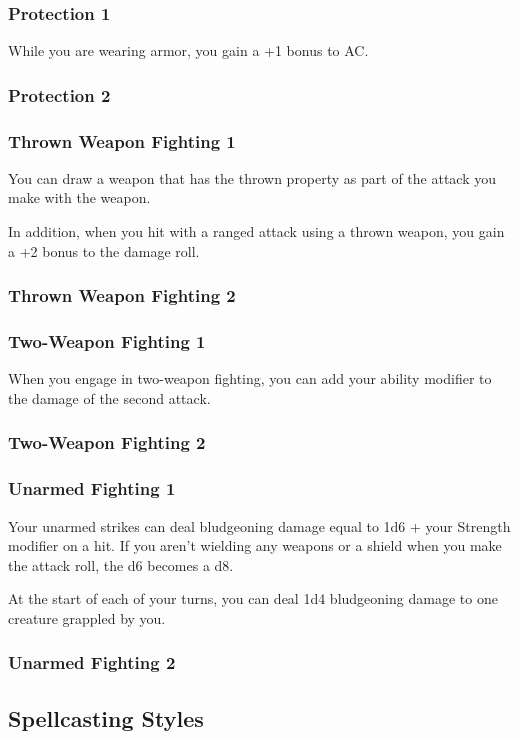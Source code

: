 \subsubsection{Protection 1}
    While you are wearing armor, you gain a +1 bonus to AC.
\subsubsection{Protection 2}
\subsubsection{Thrown Weapon Fighting 1}
    You can draw a weapon that has the thrown property as part of the attack you make with the weapon.

    In addition, when you hit with a ranged attack using a thrown weapon, you gain a +2 bonus to the damage roll.
\subsubsection{Thrown Weapon Fighting 2}
\subsubsection{Two-Weapon Fighting 1}
    When you engage in two-weapon fighting, you can add your ability modifier to the damage of the second attack.
\subsubsection{Two-Weapon Fighting 2}
\subsubsection{Unarmed Fighting 1}
    Your unarmed strikes can deal bludgeoning damage equal to 1d6 + your Strength modifier on a hit.
    If you aren't wielding any weapons or a shield when you make the attack roll, the d6 becomes a d8.

    At the start of each of your turns, you can deal 1d4 bludgeoning damage to one creature grappled by you.
\subsubsection{Unarmed Fighting 2}

\subsection*{Spellcasting Styles} \label{ssec::spellcastingstyles}



